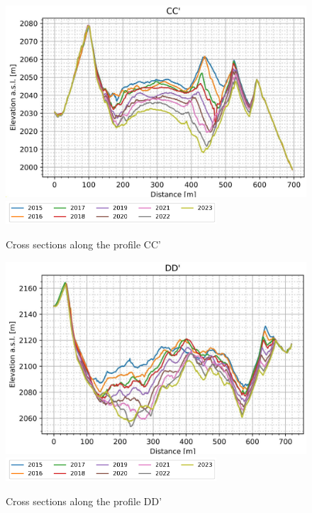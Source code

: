 \begin{figure}[p]
    \centering
    \includegraphics[width=\textwidth]{figures/appendix/profile_C.jpg}\\
    \includegraphics[width=0.7\textwidth]{figures/chapter3/profiles_legend.png}
    \caption{Cross sections along the profile CC'}
\end{figure}

\begin{figure}[p]
    \centering
    \includegraphics[width=\textwidth]{figures/appendix/profile_D.jpg}\\
    \includegraphics[width=0.7\textwidth]{figures/chapter3/profiles_legend.png}
    \caption{Cross sections along the profile DD'}
\end{figure}

